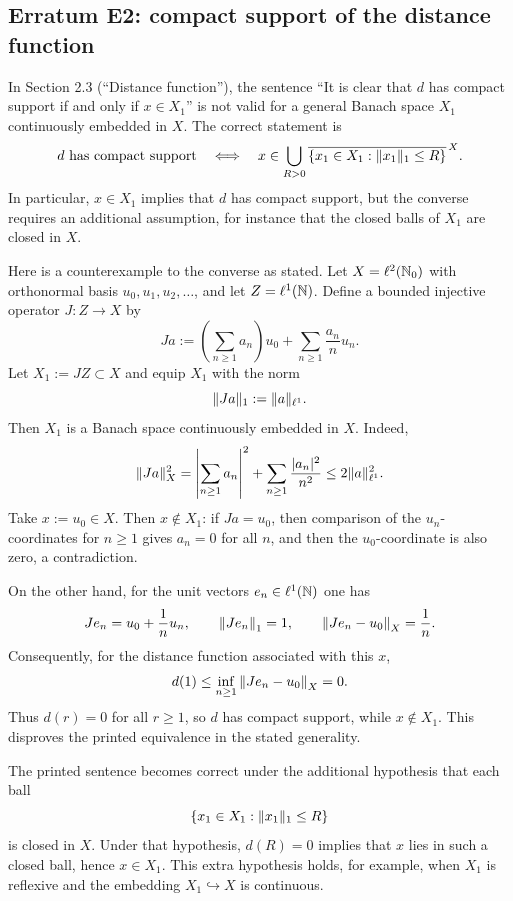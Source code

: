 
\subsection*{Erratum E2: compact support of the distance function}
\label{s:erratum:E2}

In Section 2.3 (``Distance function''), the sentence
``It is clear that $d$ has compact support if and only if $x \in X_1$''
is not valid for a general Banach space $X_1$ continuously embedded in
$X$.  The correct statement is
\[
	 d \text{ has compact support}
	 \quad\Longleftrightarrow\quad
	 x \in \bigcup_{R>0}
	 \overline{\{x_1\in X_1:\| x_1 \|_{ 1 }\leq R\}}^{\,X} .
\]
In particular, $x\in X_1$ implies that $d$ has compact support, but the
converse requires an additional assumption, for instance that the closed
balls of $X_1$ are closed in $X$.

Here is a counterexample to the converse as stated.  Let
$X=\ell^2(\mathbb{N}_0)$ with orthonormal basis $u_0,u_1,u_2,\ldots$, and let
$Z=\ell^1(\mathbb{N})$.  Define a bounded injective operator
$J:Z\to X$ by
\[
	J a
	:=
	\left(\sum_{n\geq 1} a_n\right)u_0
	+
	\sum_{n\geq 1} \frac{a_n}{n} u_n .
\]
Let $X_1:=JZ\subset X$ and equip $X_1$ with the norm
\[
	\| J a \|_{ 1 }:=\| a \|_{ \ell^1 }.
\]
Then $X_1$ is a Banach space continuously embedded in $X$.  Indeed,
\[
	\| Ja \|_{ X }^2
	=
	\left|\sum_{n\geq 1}a_n\right|^2
	+
	\sum_{n\geq 1}\frac{|a_n|^2}{n^2}
	\leq
	2\| a \|_{ \ell^1 }^2 .
\]
Take $x:=u_0\in X$.  Then $x\notin X_1$: if $Ja=u_0$, then comparison
of the $u_n$-coordinates for $n\geq 1$ gives $a_n=0$ for all $n$, and
then the $u_0$-coordinate is also zero, a contradiction.

On the other hand, for the unit vectors $e_n\in\ell^1(\mathbb{N})$ one has
\[
	J e_n = u_0 + \frac1n u_n,
	\qquad
	\left\| J e_n \right\|_{ 1 }=1,
	\qquad
	\left\| J e_n-u_0 \right\|_{ X }=\frac1n .
\]
Consequently, for the distance function associated with this $x$,
\[
	d(1)
	\leq
	\inf_{n\geq 1}\left\| J e_n-u_0 \right\|_{ X }
	=0 .
\]
Thus $d(r)=0$ for all $r\geq 1$, so $d$ has compact support, while
$x\notin X_1$.  This disproves the printed equivalence in the stated
generality.

The printed sentence becomes correct under the additional hypothesis that
each ball
\[
	\{x_1\in X_1:\| x_1 \|_{ 1 }\leq R\}
\]
is closed in $X$.  Under that hypothesis, $d(R)=0$ implies that $x$ lies
in such a closed ball, hence $x\in X_1$.  This extra hypothesis holds,
for example, when $X_1$ is reflexive and the embedding $X_1\hookrightarrow
X$ is continuous.

